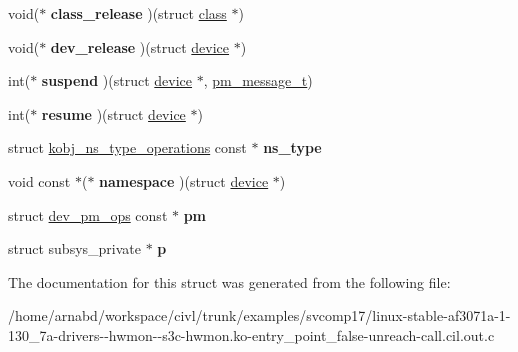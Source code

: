 \begin{DoxyCompactItemize}
\item 
\hypertarget{structclass_a67990e9a97b304b25d7558df5159a734}{}void($\ast$ {\bfseries class\+\_\+release} )(struct \hyperlink{structclass}{class} $\ast$)\label{structclass_a67990e9a97b304b25d7558df5159a734}

\item 
\hypertarget{structclass_a4f415bf3171c11e3bb4d2011ddf0694d}{}void($\ast$ {\bfseries dev\+\_\+release} )(struct \hyperlink{structdevice}{device} $\ast$)\label{structclass_a4f415bf3171c11e3bb4d2011ddf0694d}

\item 
\hypertarget{structclass_a017e0248f968dcdaefb5779b46094281}{}int($\ast$ {\bfseries suspend} )(struct \hyperlink{structdevice}{device} $\ast$, \hyperlink{structpm__message}{pm\+\_\+message\+\_\+t})\label{structclass_a017e0248f968dcdaefb5779b46094281}

\item 
\hypertarget{structclass_acf9c63f3f0d449452af7fa20f9c52fc4}{}int($\ast$ {\bfseries resume} )(struct \hyperlink{structdevice}{device} $\ast$)\label{structclass_acf9c63f3f0d449452af7fa20f9c52fc4}

\item 
\hypertarget{structclass_aa3de62b4caf5967c506dc295458c7052}{}struct \hyperlink{structkobj__ns__type__operations}{kobj\+\_\+ns\+\_\+type\+\_\+operations} const $\ast$ {\bfseries ns\+\_\+type}\label{structclass_aa3de62b4caf5967c506dc295458c7052}

\item 
\hypertarget{structclass_acd2810c87fb52218d52cbd83ca96b704}{}void const $\ast$($\ast$ {\bfseries namespace} )(struct \hyperlink{structdevice}{device} $\ast$)\label{structclass_acd2810c87fb52218d52cbd83ca96b704}

\item 
\hypertarget{structclass_a6bc0043ff88722bb80de587ea0129e95}{}struct \hyperlink{structdev__pm__ops}{dev\+\_\+pm\+\_\+ops} const $\ast$ {\bfseries pm}\label{structclass_a6bc0043ff88722bb80de587ea0129e95}

\item 
\hypertarget{structclass_a459e8e2e26344a4bdd79f8be91965c66}{}struct subsys\+\_\+private $\ast$ {\bfseries p}\label{structclass_a459e8e2e26344a4bdd79f8be91965c66}

\end{DoxyCompactItemize}


The documentation for this struct was generated from the following file\+:\begin{DoxyCompactItemize}
\item 
/home/arnabd/workspace/civl/trunk/examples/svcomp17/linux-\/stable-\/af3071a-\/1-\/130\+\_\+7a-\/drivers-\/-\/hwmon-\/-\/s3c-\/hwmon.\+ko-\/entry\+\_\+point\+\_\+false-\/unreach-\/call.\+cil.\+out.\+c\end{DoxyCompactItemize}
